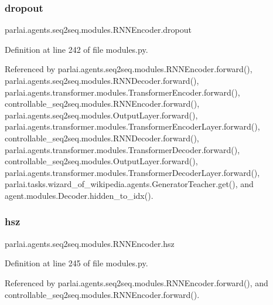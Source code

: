 \subsubsection{\texorpdfstring{dropout}{dropout}}
{\footnotesize\ttfamily parlai.\+agents.\+seq2seq.\+modules.\+R\+N\+N\+Encoder.\+dropout}



Definition at line 242 of file modules.\+py.



Referenced by parlai.\+agents.\+seq2seq.\+modules.\+R\+N\+N\+Encoder.\+forward(), parlai.\+agents.\+seq2seq.\+modules.\+R\+N\+N\+Decoder.\+forward(), parlai.\+agents.\+transformer.\+modules.\+Transformer\+Encoder.\+forward(), controllable\+\_\+seq2seq.\+modules.\+R\+N\+N\+Encoder.\+forward(), parlai.\+agents.\+seq2seq.\+modules.\+Output\+Layer.\+forward(), parlai.\+agents.\+transformer.\+modules.\+Transformer\+Encoder\+Layer.\+forward(), controllable\+\_\+seq2seq.\+modules.\+R\+N\+N\+Decoder.\+forward(), parlai.\+agents.\+transformer.\+modules.\+Transformer\+Decoder.\+forward(), controllable\+\_\+seq2seq.\+modules.\+Output\+Layer.\+forward(), parlai.\+agents.\+transformer.\+modules.\+Transformer\+Decoder\+Layer.\+forward(), parlai.\+tasks.\+wizard\+\_\+of\+\_\+wikipedia.\+agents.\+Generator\+Teacher.\+get(), and agent.\+modules.\+Decoder.\+hidden\+\_\+to\+\_\+idx().

\mbox{\label{classparlai_1_1agents_1_1seq2seq_1_1modules_1_1RNNEncoder_a7543203d711195e9f56e8536d6955f98}} 
\subsubsection{\texorpdfstring{hsz}{hsz}}
{\footnotesize\ttfamily parlai.\+agents.\+seq2seq.\+modules.\+R\+N\+N\+Encoder.\+hsz}



Definition at line 245 of file modules.\+py.



Referenced by parlai.\+agents.\+seq2seq.\+modules.\+R\+N\+N\+Encoder.\+forward(), and controllable\+\_\+seq2seq.\+modules.\+R\+N\+N\+Encoder.\+forward().

